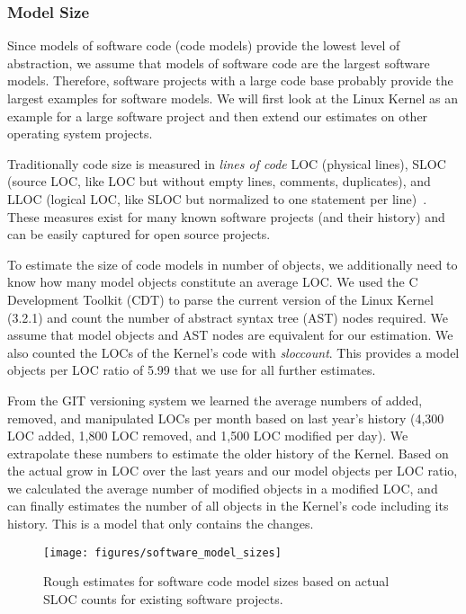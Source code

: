 \subsubsection*{Model Size}

Since models of software code (code models) provide the lowest level of abstraction, we assume that models of software code are the largest software models. Therefore, software projects with a large code base probably provide the largest examples for software models. We will first look at the Linux Kernel as an example for a large software project and then extend our estimates on other operating system projects.

Traditionally code size is measured in \emph{lines of code} LOC (physical lines), SLOC (source LOC, like LOC but without empty lines, comments, duplicates), and LLOC (logical LOC, like SLOC but normalized to one statement per line)~\cite{wheeler}.
These measures exist for many known software projects (and their history) and can be easily captured for open source projects. 

To estimate the size of code models in number of objects, we additionally need to know how many model objects constitute an average LOC. We used the C Development Toolkit (CDT) to parse the current version of the Linux Kernel (3.2.1) and count the number of abstract syntax tree (AST) nodes required. We assume that model objects and AST nodes are equivalent for our estimation. We also counted the LOCs of the Kernel's code with \emph{sloccount}. This provides a model objects per LOC ratio of 5.99 that we use for all further estimates.

From the GIT versioning system we learned the average numbers of added, removed, and manipulated LOCs per month based on last year's history (4,300 LOC added, 1,800 LOC removed, and 1,500 LOC modified per day). We extrapolate these numbers to estimate the older history of the Kernel. Based on the actual grow in LOC over the last years and our model objects per LOC ratio, we calculated the average number of modified objects in a modified LOC, and can finally estimates the number of all objects in the Kernel's code including its history. This is a model that only contains the changes.

\begin{figure}
  \centering
  \texttt{[image: figures/software\_model\_sizes]}
  \caption{Rough estimates for software code model sizes based on actual SLOC counts for existing software projects.}
  \label{fig:software_model_sizes}
\end{figure}


